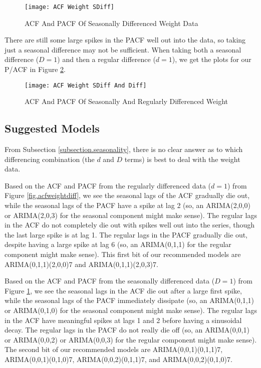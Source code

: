 \documentclass[12pt, letterpaper]{article}
\theoremstyle{definition}
\numberwithin{equation}{section}
\newcommand{\+}[1]{+_{\scalebox{.375}{#1}}}
\newcommand{\1}{\mathbbm{1}}
\begin{document}
\begin{figure}[H]
	\centering
	\texttt{[image: ACF Weight SDiff]}
	\caption{ACF And PACF Of Seasonally Differenced Weight Data}
	\label{fig.sdiffacf}
\end{figure}

There are still some large spikes in the PACF well out into the data, so taking just a seasonal difference may not be sufficient. When taking both a seasonal difference ($D=1$) and then a regular difference ($d=1$), we get the plots for our P/ACF in Figure \ref{fig.bothacf}.

\begin{figure}[H]
	\centering
	\texttt{[image: ACF Weight SDiff And Diff]}
	\caption{ACF And PACF Of Seasonally And Regularly Differenced Weight}
	\label{fig.bothacf}
\end{figure}


\subsection{Suggested Models}
\label{subsection.suggestedmodels}

From Subsection \ref{subsection.seasonality}, there is no clear answer as to which differencing combination (the $d$ and $D$ terms) is best to deal with the weight data.
\vspace{\baselineskip}

Based on the ACF and PACF from the regularly differenced data ($d=1$) from Figure \ref{fig.acfweightdiff}, we see the seasonal lags of the ACF gradually die out, while the seasonal lags of the PACF have a spike at lag 2 (so, an ARIMA(2,0,0) or ARIMA(2,0,3) for the seasonal component might make sense). The regular lags in the ACF do not completely die out with spikes well out into the series, though the last large spike is at lag 1. The regular lags in the PACF gradually die out, despite having a large spike at lag 6 (so, an ARIMA(0,1,1) for the regular component might make sense). This first bit of our recommended models are ARIMA(0,1,1)(2,0,0)7 and ARIMA(0,1,1)(2,0,3)7.
\vspace{\baselineskip}

Based on the ACF and PACF from the seasonally differenced data ($D=1$) from Figure \ref{fig.sdiffacf}, we see the seasonal lags in the ACF die out after a large first spike, while the seasonal lags of the PACF immediately dissipate (so, an ARIMA(0,1,1) or ARIMA(0,1,0) for the seasonal component might make sense). The regular lags in the ACF have meaningful spikes at lags 1 and 2 before having a sinusoidal decay. The regular lags in the PACF do not really die off (so, an ARIMA(0,0,1) or ARIMA(0,0,2) or ARIMA(0,0,3) for the regular component might make sense). The second bit of our recommended models are ARIMA(0,0,1)(0,1,1)7, ARIMA(0,0,1)(0,1,0)7, ARIMA(0,0,2)(0,1,1)7, and ARIMA(0,0,2)(0,1,0)7.
\vspace{\baselineskip}
\end{document}
